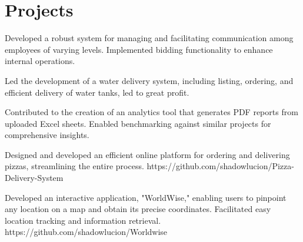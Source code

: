\documentclass[]{deedy-resume-openfont}
\begin{document}
\begin{minipage}[t]{0.66\textwidth}
\section{Projects}


\begin{tightemize}
\item Developed a robust system for managing and facilitating communication among employees of varying levels. Implemented bidding functionality to enhance internal operations.
\end{tightemize}
\sectionsep

\begin{tightemize}
\item Led the development of a water delivery system, including listing, ordering, and efficient delivery of water tanks, led to great profit.
\end{tightemize}
\sectionsep

\begin{tightemize}
\item Contributed to the creation of an analytics tool that generates PDF reports from uploaded Excel sheets. Enabled benchmarking against similar projects for comprehensive insights.
\end{tightemize}
\sectionsep

\begin{tightemize}
\item Designed and developed an efficient online platform for ordering and delivering pizzas, streamlining the entire process.
https://github.com/shadowlucion/Pizza-Delivery-System
\end{tightemize}
\sectionsep


\begin{tightemize}
\item Developed an interactive application, "WorldWise," enabling users to pinpoint any location on a map and obtain its precise coordinates. Facilitated easy location tracking and information retrieval.
https://github.com/shadowlucion/Worldwise
\end{tightemize}
\sectionsep








% 
% 

\end{minipage} 
\end{document}

